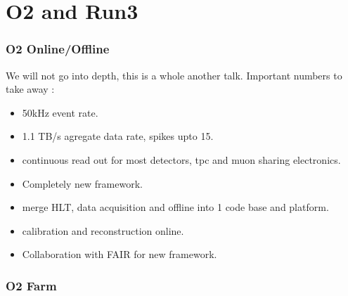 \documentclass{beamer}
\begin{document}
\section{O2 and Run3}
\begin{frame}
\frametitle{O2 Online/Offline}
We will not go into depth, this is a whole another talk.
Important numbers to take away :
\begin{itemize}
  \item 50kHz event rate.
  \item 1.1 TB/s agregate data rate, spikes upto 15.
  \item continuous read out for most detectors, tpc and muon sharing electronics.
  \item Completely new framework.
  \item merge HLT, data acquisition and offline into 1 code base and platform.
  \item calibration and reconstruction online.
  \item Collaboration with FAIR for new framework.
\end{itemize}

\end{frame}
\begin{frame}
  \frametitle{O2 Farm}
\end{frame}
\end{document}
